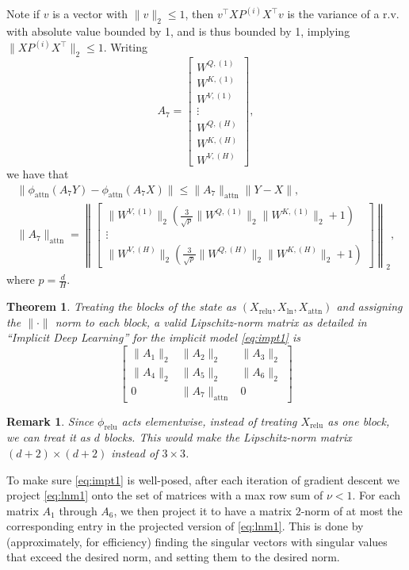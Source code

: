 \documentclass{article}
\newtheorem{theorem}{Theorem}
\newtheorem{remark}{Remark}
\begin{document}
Note if $v$ is a vector with $\|v\|_2\leq 1$, then 
$v^\top XP^{(i)}X^\top v$ is the variance of a r.v. with absolute value 
bounded by 1, and is thus bounded by 1, implying $\|XP^{(i)}X^\top\|_2\leq 1$.
Writing 
\begin{equation*}
  A_7 = \begin{bmatrix} W^{Q, (1)} \\ W^{K, (1)} \\ W^{V, (1)} \\\vdots \\
    W^{Q, (H)} \\ W^{K, (H)} \\ W^{V, (H)} \end{bmatrix},
\end{equation*} we have that 
\begin{gather*}
  \|\phi_\text{attn}(A_7 Y)  - \phi_\text{attn}(A_7 X)\| \leq \|A_7\|_{
  \text{attn}}\|Y - X\|,\\
  \|A_7\|_\text{attn} =
  \left\|\begin{bmatrix} \|W^{V, (1)}\|_2\left(\frac3{\sqrt p}\|W^{Q, (1)}\|_2
    \|W^{K, (1)}\|_2 + 1\right) \\ \vdots \\ \|W^{V,(H)}\|_2\left(\frac3{\sqrt p}
    \|W^{Q, (H)}\|_2\|W^{K, (H)}\|_2 + 1\right)\end{bmatrix}\right\|_2,
\end{gather*}
where $p = \frac dH$.
\begin{theorem}
  Treating the blocks of the state as $(X_\text{relu}, X_\text{ln}, X_\text{attn}
  )$ and assigning the $\|\cdot\|$ norm to each block,
  a valid Lipschitz-norm matrix as detailed in ``Implicit Deep Learning''
  for the implicit model \eqref{eq:impt1} is 
  \begin{equation}
    \label{eq:lnm1}
    \begin{bmatrix} \|A_1\|_2 & \|A_2\|_2 & \|A_3\|_2 \\
      \|A_4\|_2 & \|A_5\|_2 & \|A_6\|_2 \\
      0 & \|A_7\|_\text{attn} & 0
    \end{bmatrix}
  \end{equation}
\end{theorem}
\begin{remark}
  Since $\phi_\text{relu}$ acts elementwise, instead of treating $X_\text{relu}$
  as one block, we can treat it as $d$ blocks. This would make the 
  Lipschitz-norm matrix $(d+2)\times (d+2)$ instead of $3\times 3$.
\end{remark}
To make sure \eqref{eq:impt1} is well-posed, after each iteration of 
gradient descent we project \eqref{eq:lnm1} onto the set of matrices
with a max row sum of $\nu < 1$. 
For each matrix $A_1$ through $A_6$, we then project
it to have a matrix $2$-norm of at most the corresponding entry in the 
projected version of \eqref{eq:lnm1}. This is done by (approximately, for 
efficiency) finding
the singular vectors with singular values that exceed the desired norm, 
and setting them to the desired norm.  
\end{document}
